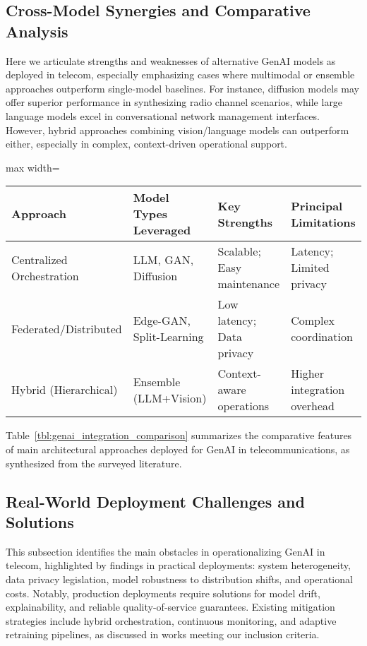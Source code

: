 \documentclass[sigconf]{acmart}
\begin{document}
\subsection{Cross-Model Synergies and Comparative Analysis}
Here we articulate strengths and weaknesses of alternative GenAI models as deployed in telecom, especially emphasizing cases where multimodal or ensemble approaches outperform single-model baselines. For instance, diffusion models may offer superior performance in synthesizing radio channel scenarios, while large language models excel in conversational network management interfaces. However, hybrid approaches combining vision/language models can outperform either, especially in complex, context-driven operational support.

\begin{table*}[htbp]
\centering
\caption{Comparison of GenAI Model Integration Approaches in Telecom Deployment}
\label{tbl:genai_integration_comparison}
\begin{adjustbox}{max width=\textwidth}
\begin{tabular}{@{}llll@{}}
\toprule
Approach & Model Types Leveraged & Key Strengths & Principal Limitations \\
\midrule
Centralized Orchestration & LLM, GAN, Diffusion & Scalable; Easy maintenance & Latency; Limited privacy \\
Federated/Distributed & Edge-GAN, Split-Learning & Low latency; Data privacy & Complex coordination \\
Hybrid (Hierarchical) & Ensemble (LLM+Vision) & Context-aware operations & Higher integration overhead \\
\bottomrule
\end{tabular}
\end{adjustbox}
\end{table*}

Table~\ref{tbl:genai_integration_comparison} summarizes the comparative features of main architectural approaches deployed for GenAI in telecommunications, as synthesized from the surveyed literature.

\subsection{Real-World Deployment Challenges and Solutions}
This subsection identifies the main obstacles in operationalizing GenAI in telecom, highlighted by findings in practical deployments: system heterogeneity, data privacy legislation, model robustness to distribution shifts, and operational costs. Notably, production deployments require solutions for model drift, explainability, and reliable quality-of-service guarantees. Existing mitigation strategies include hybrid orchestration, continuous monitoring, and adaptive retraining pipelines, as discussed in works meeting our inclusion criteria.
\end{document}
